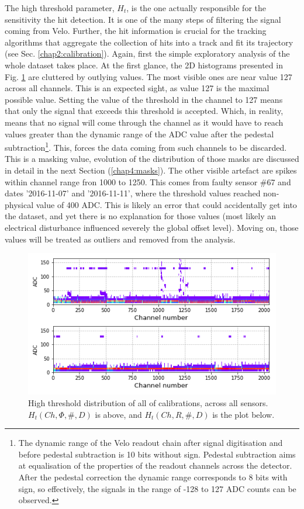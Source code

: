 The high threshold parameter, $H_{t}$, is the one actually responsible for the sensitivity the hit detection. It is one of the many steps of filtering the signal coming from Velo. Further, the hit information is crucial for the tracking algorithms that aggregate the collection of hits into a track and fit its trajectory (see Sec. \ref{chap2:calibration}).
Again, first the simple exploratory analysis of the whole dataset takes place. At the first glance, the 2D histograms presented in Fig. \ref{plot:part2-threshold-all} are cluttered by outlying values.
The most visible ones are near value 127 across all channels.
This is an expected sight, as value 127 is the maximal possible value.
Setting the value of the threshold in the channel to 127 means that only the signal that exceeds this threshold is accepted. Which, in reality, means that no signal will come through the channel as it would have to reach values greater than the dynamic range of the ADC value after the pedestal subtraction\footnote{The dynamic range of the Velo readout chain after signal digitisation and before pedestal subtraction is 10 bits without sign. Pedestal subtraction aims at equalisation of the properties of the readout channels across the detector. After the pedestal correction the dynamic range corresponds to 8 bits with sign, so effectively, the signals in the range of -128 to 127 ADC counts can be observed.}. This, forces the data coming from such channels to be discarded.
This is a masking value, evolution of the distribution of those masks are discussed in detail in the next Section (\ref{chap4:masks}).
The other visible artefact are spikes within channel range fron 1000 to 1250.
This comes from faulty  sensor  \#67  and  dates  ’2016-11-07’  and  ’2016-11-11’,  where  the  threshold  values  reached non-physical value of 400  ADC. This is likely an error that could accidentally get into the dataset, and yet there is no explanation for those values (most likely an electrical disturbance influenced severely the global offset level).
Moving on, those values will be treated as outliers and removed from the analysis.

\begin{figure}
    \centering
    \includegraphics[width=0.7\linewidth]{figures/chapter4/calib_analysis/P2-threshold-all-r-phi.png}
    \caption{High threshold distribution of all of calibrations, across all sensors. $H_t(Ch,\Phi,\#, D)$ is above, and $H_t(Ch,R,\#, D)$ is the plot below.}
    \label{plot:part2-threshold-all}
\end{figure}



